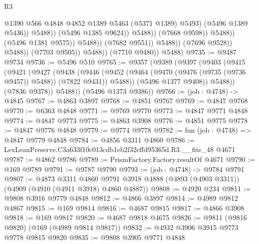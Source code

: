 \begin{lexlean}{R3}
\begin{coremodule}
                                                    @1390
                                                    @566
                                                    @4848
                                                    @4852
                                                    @1389
                                                    @5463
                                                    (@5371 @1389)
                                                    @5493)
                                                  (@5496 @1389 @5436))
                                                @5488))
                                            (@5496 @1385 @9624))
                                          @5488))
                                      (@7668 @9598))
                                    @5488))
                                (@5496 @1381 @9575))
                              @5488))
                          (@7682 @9551))
                        @5488))
                    (@7696 @9528))
                  @5488))
              (@7703 @9505))
            @5488))
        (@7710 @9480))
      @5488)
@9735 := @9487 @9734
@9736 := @5496 @510
@9765 := @9357
    (@9389
      (@9397
        (@9403
          (@9415
            (@9421
              (@9427
                (@9438
                  (@9446
                    (@9452 (@9464 (@9470 (@9476 (@9735 (@9736 @9457)) @5488)) (@7822 @9431)) @5488))
                  (@5496 @1377 @9408))
                @5488))
            (@7836 @9378))
          @5488))
      (@5496 @1373 @9386))
@9766 := (job : @4748) -> @4845
@9767 := @4863 @3897
@9768 := @4851 @9767
@9769 := @4847 @9768
@9770 := @6363 @4848
@9771 := @9769 @9770
@9773 := @4847 @9771 @4848
@9774 := @4847 @9773
@9775 := @4863 @3908
@9776 := @4851 @9775
@9778 := @4847 @9776 @4848
@9779 := @9774 @9778
@9782 := fun (job : @4748) => @4847 @9779 @4848
@9784 := @4856 @3311 @4860
@9786 := LexLeanPreserve.C3a633f10c013cdb1eb2f32effd95365d.R3.__fits_48 @4671
@9787 := @4862 @9786
@9789 := PrismFactory.Factory.resultOf @4671
@9790 := @169 @9789
@9791 := @9787 @9790
@9793 := (job : @4748) -> @9784 @9791
@9807 := @4873
    @3311
    @4860
    @9791
    @3918
    @4888
    (@4893 (@4903 @3311))
    (@4909 (@4910 (@4911 @3918) @4860 @4887))
@9808 := @4920 @234
@9811 := @9808 @3916 @9779 @4848
@9812 := @4866 @3897
@9814 := @4989 @9812 @4867
@9815 := @169 @9814
@9816 := @4687 @9815
@9817 := @4866 @3908
@9818 := @169 @9817
@9820 := @4687 @9818 @4675
@9826 := @9811 (@9816 @9820) (@169 (@4989 @9814 @9817))
@9832 := @4932 @3906 @3915 @9773 @9778 @9815 @9820
@9835 := @9808 @3905 @9771 @4848

\end{coremodule}
\end{lexlean}
